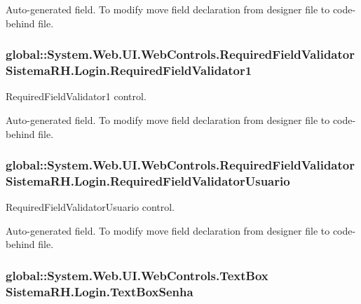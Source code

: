 Auto-\/generated field. To modify move field declaration from designer file to code-\/behind file. \hypertarget{class_sistema_r_h_1_1_login_a8714ab168feb1904d6fb2461bf744b46}{
\subsubsection[{RequiredFieldValidator1}]{\setlength{\rightskip}{0pt plus 5cm}global::System.Web.UI.WebControls.RequiredFieldValidator {\bf SistemaRH.Login.RequiredFieldValidator1}}}
\label{class_sistema_r_h_1_1_login_a8714ab168feb1904d6fb2461bf744b46}


RequiredFieldValidator1 control. 

Auto-\/generated field. To modify move field declaration from designer file to code-\/behind file. \hypertarget{class_sistema_r_h_1_1_login_ab9d57c98d63d3835f67a8224e96bbc46}{
\subsubsection[{RequiredFieldValidatorUsuario}]{\setlength{\rightskip}{0pt plus 5cm}global::System.Web.UI.WebControls.RequiredFieldValidator {\bf SistemaRH.Login.RequiredFieldValidatorUsuario}}}
\label{class_sistema_r_h_1_1_login_ab9d57c98d63d3835f67a8224e96bbc46}


RequiredFieldValidatorUsuario control. 

Auto-\/generated field. To modify move field declaration from designer file to code-\/behind file. \hypertarget{class_sistema_r_h_1_1_login_a0d19fb767cfff8be37b6f9075b3016da}{
\subsubsection[{TextBoxSenha}]{\setlength{\rightskip}{0pt plus 5cm}global::System.Web.UI.WebControls.TextBox {\bf SistemaRH.Login.TextBoxSenha}}}
\label{class_sistema_r_h_1_1_login_a0d19fb767cfff8be37b6f9075b3016da}


